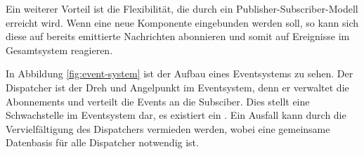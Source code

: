 Ein weiterer Vorteil ist die Flexibilität, die durch ein Publisher-Subscriber-Modell erreicht wird. Wenn eine neue Komponente eingebunden werden soll, so kann sich diese auf bereits emittierte Nachrichten abonnieren und somit auf Ereignisse im Gesamtsystem reagieren.

In Abbildung \ref{fig:event-system} ist der Aufbau eines Eventsystems zu sehen. Der Dispatcher ist der Dreh und Angelpunkt im Eventsystem, denn er verwaltet die Abonnements und verteilt die Events an die Subsciber. Dies stellt eine Schwachstelle im Eventsystem dar, es existiert ein . Ein Ausfall kann durch die Vervielfältigung des Dispatchers vermieden werden, wobei eine gemeinsame Datenbasis für alle Dispatcher notwendig ist. 
